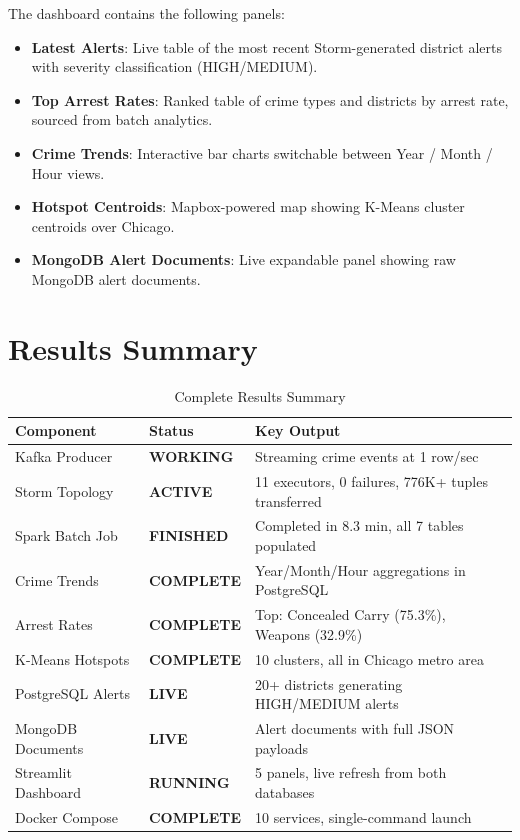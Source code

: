 \documentclass[12pt,a4paper]{article}
\begin{document}
\noindent The dashboard contains the following panels:

\begin{itemize}[leftmargin=1.6em]
  \item \textbf{Latest Alerts}: Live table of the most recent Storm-generated district alerts with severity classification (HIGH/MEDIUM).
  \item \textbf{Top Arrest Rates}: Ranked table of crime types and districts by arrest rate, sourced from batch analytics.
  \item \textbf{Crime Trends}: Interactive bar charts switchable between Year / Month / Hour views.
  \item \textbf{Hotspot Centroids}: Mapbox-powered map showing K-Means cluster centroids over Chicago.
  \item \textbf{MongoDB Alert Documents}: Live expandable panel showing raw MongoDB alert documents.
\end{itemize}

\section{Results Summary}

\begin{table}[H]
\centering
\caption{Complete Results Summary}
\begin{tabularx}{\textwidth}{llX}
\toprule
\textbf{Component} & \textbf{Status} & \textbf{Key Output}\\
\midrule
Kafka Producer & \textcolor{green!60!black}{\textbf{WORKING}} & Streaming crime events at 1 row/sec \\
Storm Topology & \textcolor{green!60!black}{\textbf{ACTIVE}} & 11 executors, 0 failures, 776K+ tuples transferred \\
Spark Batch Job & \textcolor{green!60!black}{\textbf{FINISHED}} & Completed in 8.3 min, all 7 tables populated \\
Crime Trends & \textcolor{green!60!black}{\textbf{COMPLETE}} & Year/Month/Hour aggregations in PostgreSQL \\
Arrest Rates & \textcolor{green!60!black}{\textbf{COMPLETE}} & Top: Concealed Carry (75.3\%), Weapons (32.9\%) \\
K-Means Hotspots & \textcolor{green!60!black}{\textbf{COMPLETE}} & 10 clusters, all in Chicago metro area \\
PostgreSQL Alerts & \textcolor{green!60!black}{\textbf{LIVE}} & 20+ districts generating HIGH/MEDIUM alerts \\
MongoDB Documents & \textcolor{green!60!black}{\textbf{LIVE}} & Alert documents with full JSON payloads \\
Streamlit Dashboard & \textcolor{green!60!black}{\textbf{RUNNING}} & 5 panels, live refresh from both databases \\
Docker Compose & \textcolor{green!60!black}{\textbf{COMPLETE}} & 10 services, single-command launch \\
\bottomrule
\end{tabularx}
\end{table}
\end{document}

